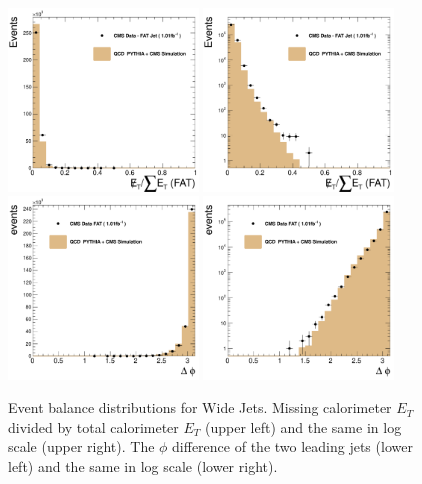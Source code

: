 \begin{figure}[!ht]
  \begin{center}
   \includegraphics[width=0.45\textwidth]{Figures/c_MET_over_sumEt_fat.pdf}
   \includegraphics[width=0.45\textwidth]{Figures/c_MET_over_sumEt_fat_log.pdf}
   \includegraphics[width=0.45\textwidth]{Figures/c_DPhi_fat.pdf}
   \includegraphics[width=0.45\textwidth]{Figures/c_DPhi_fat_log.pdf}

   \caption{ Event balance distributions for Wide Jets.  Missing
    calorimeter $E_T$ divided by total calorimeter $E_T$ 
    (upper left) and the same in log scale (upper right).
    The $\phi$ difference of the two leading jets (lower left) 
    and the same in log scale (lower right).}
    \label{basic_event_pf}
  \end{center}
\end{figure}

